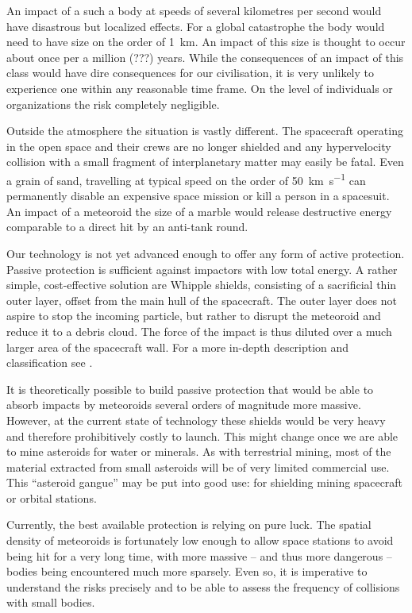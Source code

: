     An impact of a such a body at speeds of several kilometres per second would have disastrous but localized effects.
    For a global catastrophe the body would need to have size on the order
    of \SI{1}{\kilo\metre}. An impact of this size is thought to occur about once per a million (???) years. 
    While the consequences of an impact of this class would have dire consequences for our civilisation,
    it is very unlikely to experience one within any reasonable time frame.
    On the level of individuals or organizations the risk completely negligible.

    Outside the atmosphere the situation is vastly different.
    The spacecraft operating in the open space and their crews are no longer shielded
    and any hypervelocity collision with a small fragment of interplanetary matter may easily be fatal.
    Even a grain of sand, travelling at typical speed on the order of \SI{50}{\kilo\metre\per\second} can permanently disable
    an expensive space mission or kill a person in a spacesuit.
    An impact of a meteoroid the size of a marble would release
    destructive energy comparable to a direct hit by an anti-tank round.

    Our technology is not yet advanced enough to offer any form of active protection.
    Passive protection is sufficient against impactors with low total energy.
    A rather simple, cost-effective solution are Whipple shields, consisting of a sacrificial thin outer layer,
    offset from the main hull of the spacecraft.
    The outer layer does not aspire to stop the incoming particle,
    but rather to disrupt the meteoroid and reduce it to a debris cloud.
    The force of the impact is thus diluted over a much larger area of the spacecraft wall.
    For a more in-depth description and classification see \citet{nasa-shield}.

    It is theoretically possible to build passive protection that would be able to absorb impacts
    by meteoroids several orders of magnitude more massive.
    However, at the current state of technology these shields would be very heavy and therefore prohibitively costly to launch.
    This might change once we are able to mine asteroids for water or minerals.
    As with terrestrial mining, most of the material extracted from small asteroids will be of very limited commercial use.
    This ``asteroid gangue'' may be put into good use: for shielding mining spacecraft or orbital stations.

    Currently, the best available protection is relying on pure luck. The spatial density of meteoroids is
    fortunately low enough to allow space stations to avoid being hit for a very long time,
    with more massive -- and thus more dangerous -- bodies being encountered much more sparsely.
    Even so, it is imperative to understand the risks precisely and to be able to assess the frequency
    of collisions with small bodies.

